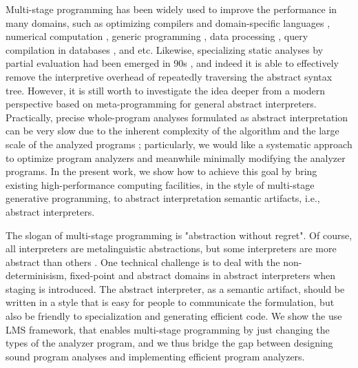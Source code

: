 Multi-stage programming has been widely used to improve the performance in many domains, 
such as optimizing compilers and domain-specific languages \cite{DBLP:conf/pldi/RompfSBLCO14, DBLP:conf/snapl/RompfBLSJAOSKDK15,
DBLP:journals/tecs/SujeethBLRCOO14, DBLP:conf/gpce/SujeethGBLROO13, DBLP:journals/jfp/CaretteKS09},
numerical computation \cite{PGL-038, DBLP:conf/pepm/AktemurKKS13}, 
generic programming \cite{DBLP:journals/pacmpl/Yallop17}, 
data processing \cite{DBLP:conf/oopsla/JonnalageddaCSRO14, DBLP:conf/popl/KiselyovBPS17}, 
query compilation in databases \cite{DBLP:conf/osdi/EssertelTDBOR18, DBLP:conf/sigmod/TahboubER18},
and etc.
Likewise, specializing static analyses by partial evaluation had been emerged in 90s 
\cite{damian1999partial, amtoft1999partial, Boucher:1996:ACN:647473.727587, ashley:practical}, 
and indeed it is able to effectively remove the interpretive overhead of 
repeatedly traversing the abstract syntax tree. However, it is still worth 
to investigate the idea deeper from a modern perspective based on meta-programming 
for general abstract interpreters.
Practically, precise whole-program analyses formulated as abstract interpretation 
can be very slow due to the inherent complexity of the algorithm and the large scale 
of the analyzed programs \cite{toman_et_al:LIPIcs:2017:7121} ;
particularly, we would like a systematic approach to optimize program 
analyzers and meanwhile minimally modifying the analyzer programs.
In the present work, we show how to achieve this goal by bring existing 
high-performance computing facilities, in the style of multi-stage generative
programming, to abstract interpretation semantic artifacts, i.e., 
abstract interpreters. 

The slogan of multi-stage programming is "abstraction without regret". 
Of course, all interpreters are metalinguistic abstractions, but some interpreters are more abstract 
than others . 
One technical challenge is to deal with the non-determinisism, fixed-point and abstract domains in 
abstract interpreters when staging is introduced. The abstract interpreter, as a semantic artifact, 
should be written in a style that is easy for people to communicate the formulation, but also be friendly
to specialization and generating efficient code. 
We show the use LMS framework, that enables multi-stage programming by just changing the types 
of the analyzer program, and we thus bridge the gap between designing sound program analyses 
and implementing efficient program analyzers.

